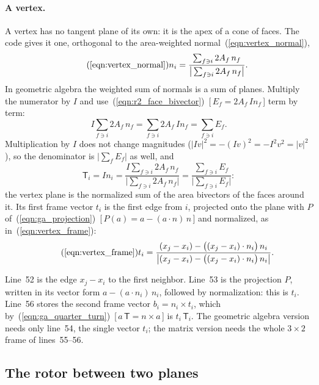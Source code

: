 \paragraph{A vertex.} A vertex has no tangent plane of its own: it is the apex of a cone of faces. The code gives it one, orthogonal to the area-weighted normal~(\ref{eqn:vertex_normal}),
\begin{equation*}
\tag{\ref{eqn:vertex_normal}}
n_i = \frac{\sum_{f \ni i} 2 A_f\, n_f}{\big|\sum_{f \ni i} 2 A_f\, n_f\big|} .
\end{equation*}
In geometric algebra the weighted sum of normals is a sum of planes. Multiply the numerator by $I$ and use~(\ref{eqn:r2_face_bivector})~[\,$E_f = 2A_f\, I n_f$\,] term by term:
\begin{equation*}
I\sum_{f\ni i} 2A_f\, n_f = \sum_{f\ni i} 2A_f\, I n_f = \sum_{f\ni i} E_f .
\end{equation*}
Multiplication by $I$ does not change magnitudes ($|Iv|^2 = -(Iv)^2 = -I^2v^2 = |v|^2$), so the denominator is $\big|\sum_f E_f\big|$ as well, and
\begin{equation*}
\mathsf T_i = I n_i = \frac{I\sum_{f \ni i} 2A_f\, n_f}{\big|\sum_{f\ni i} 2A_f\, n_f\big|} = \frac{\sum_{f \ni i} E_f}{\big|\sum_{f\ni i} E_f\big|} :
\end{equation*}
the vertex plane is the normalized sum of the area bivectors of the faces around it. Its first frame vector $t_i$ is the first edge from $i$, projected onto the plane with $P$ of~(\ref{eqn:ga_projection})~[\,$P(a) = a - (a\cdot n)\, n$\,] and normalized, as in~(\ref{eqn:vertex_frame}):
\begin{equation*}
\tag{\ref{eqn:vertex_frame}}
t_i = \frac{(x_j - x_i) - \big((x_j - x_i) \cdot n_i\big)\, n_i}{\big|(x_j - x_i) - \big((x_j - x_i) \cdot n_i\big)\, n_i\big|} .
\end{equation*}

Line~52 is the edge $x_j - x_i$ to the first neighbor. Line~53 is the projection $P$, written in its vector form $a - (a\cdot n_i)\, n_i$, followed by normalization: this is $t_i$. Line~56 stores the second frame vector $b_i = n_i\times t_i$, which by~(\ref{eqn:ga_quarter_turn})~[\,$a\,\mathsf T = n\times a$\,] is $t_i\,\mathsf T_i$. The geometric algebra version needs only line~54, the single vector $t_i$; the matrix version needs the whole $3\times 2$ frame of lines~55--56.

\subsection{The rotor between two planes}
\label{section:ga_rotor}


